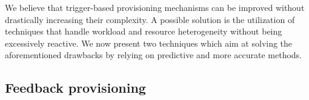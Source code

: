 We believe that trigger-based provisioning mechanisms can be improved
without drastically increasing their complexity. A possible solution
is the utilization of techniques that handle workload and resource
heterogeneity without being excessively reactive. We now present two
techniques which aim at solving the aforementioned drawbacks by relying
on predictive and more accurate methods.







\subsection*{Feedback provisioning}




